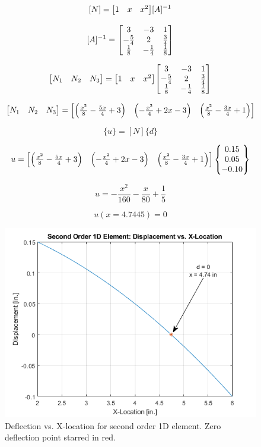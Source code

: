 \documentclass[../main.tex]{subfiles}
\begin{document}
\[
    [N] = \mqty[1 & x & x^2][A]^{-1}
\]

\[
    [A]^{-1} = 
    \mqty[
        3 & -3 & 1\\
        -\frac{5}{4} & 2 & \frac{3}{4}\\
        \frac{1}{8} & -\frac{1}{4} & \frac{1}{8}
    ]
\]

\[
    \mqty[N_1 & N_2 & N_3] = \mqty[1 & x & x^2] \mqty[
        3 & -3 & 1\\
        -\frac{5}{4} & 2 & \frac{3}{4}\\
        \frac{1}{8} & -\frac{1}{4} & \frac{1}{8}
    ]
\]

\[
    \mqty[N_1 & N_2 & N_3] = \mqty[\left({\frac{x^2}{8}-\frac{5x}{4}+ 3}\right) & \left({-\frac{x^2}{4}+2x-3}\right) & \left({\frac{x^2}{8}-\frac{3x}{4}+1}\right)]
\]

\[
    \{u\} = [N]\{d\}
\]

\[
    u =  \mqty[\left({\frac{x^2}{8}-\frac{5x}{4}+ 3}\right) & \left({-\frac{x^2}{4}+2x-3}\right) & \left({\frac{x^2}{8}-\frac{3x}{4}+1}\right)] 
    \begin{Bmatrix}
        0.15 \\ 0.05 \\ -0.10
    \end{Bmatrix}
\]

\[
    u = -\frac{x^2}{160} - \frac{x}{80} + \frac{1}{5}
\]

\[
    \boxed{
    u(x=4.7445) = 0
    }
\]

\begin{figure}[h!]
    \centering
    \includegraphics[scale=1]{../../images/problem_2/deflection_plot.png}
    \caption{Deflection vs. X-location for second order 1D element. Zero deflection point starred in red.}
    \label{deflection_plot}
\end{figure}
\end{document}
